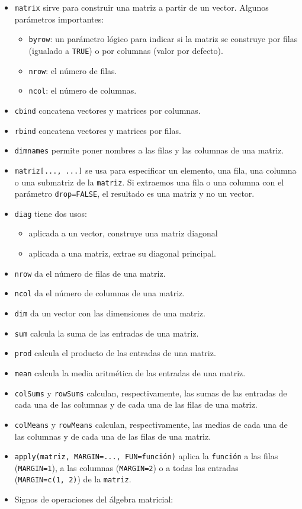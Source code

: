 \documentclass[]{book}
\providecommand{\tightlist}{%
  \setlength{\itemsep}{0pt}\setlength{\parskip}{0pt}}
\theoremstyle{definition}
\theoremstyle{definition}
\theoremstyle{definition}
\theoremstyle{remark}
\begin{document}
\begin{itemize}
\tightlist
\item
  \texttt{matrix} sirve para construir una matriz a partir de un vector. Algunos parámetros importantes:

  \begin{itemize}
  \tightlist
  \item
    \texttt{byrow}: un parámetro lógico para indicar si la matriz se construye por filas (igualado a \texttt{TRUE}) o por columnas (valor por defecto).
  \item
    \texttt{nrow}: el número de filas.
  \item
    \texttt{ncol}: el número de columnas.
  \end{itemize}
\item
  \texttt{cbind} concatena vectores y matrices por columnas.
\item
  \texttt{rbind} concatena vectores y matrices por filas.
\item
  \texttt{dimnames} permite poner nombres a las filas y las columnas de una matriz.
\item
  \texttt{matriz{[}...,\ ...{]}} se usa para especificar un elemento, una fila, una columna o una submatriz de la \texttt{matriz}. Si extraemos una fila o una columna con el parámetro \texttt{drop=FALSE}, el resultado es una matriz y no un vector.
\item
  \texttt{diag} tiene dos usos:

  \begin{itemize}
  \tightlist
  \item
    aplicada a un vector, construye una matriz diagonal
  \item
    aplicada a una matriz, extrae su diagonal principal.
  \end{itemize}
\item
  \texttt{nrow} da el número de filas de una matriz.
\item
  \texttt{ncol} da el número de columnas de una matriz.
\item
  \texttt{dim} da un vector con las dimensiones de una matriz.
\item
  \texttt{sum} calcula la suma de las entradas de una matriz.
\item
  \texttt{prod} calcula el producto de las entradas de una matriz.
\item
  \texttt{mean} calcula la media aritmética de las entradas de una matriz.
\item
  \texttt{colSums} y \texttt{rowSums} calculan, respectivamente, las sumas de las entradas de cada una de las columnas y de cada una de las filas de una matriz.
\item
  \texttt{colMeans} y \texttt{rowMeans} calculan, respectivamente, las medias de cada una de las columnas y de cada una de las filas de una matriz.
\item
  \texttt{apply(matriz,\ MARGIN=...,\ FUN=función)} aplica la \texttt{función} a las filas (\texttt{MARGIN=1}), a las columnas (\texttt{MARGIN=2}) o a todas las entradas (\texttt{MARGIN=c(1,\ 2)}) de la \texttt{matriz}.
\item
  Signos de operaciones del álgebra matricial:


\end{itemize}
\end{document}
